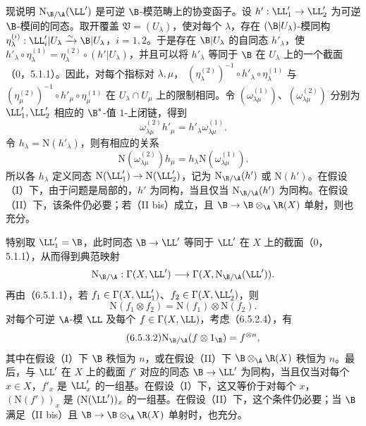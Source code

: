 现说明 $\mathrm N_{\B/\A}(\LL')$ 是可逆 $\B$-模范畴上的协变函子。设 $h':\LL'_1\to\LL'_2$ 为可逆 $\B$-模间的同态。取开覆盖 $\mathfrak V=(U_\lambda)$，使对每个 $\lambda$，存在 $(\B|U_\lambda)$-模同构
$\eta_\lambda^{(i)}:\LL'_i|U_\lambda\xrightarrow{\sim}\B|U_\lambda$，$i=1,2$。于是存在 $\B|U_\lambda$ 的自同态 $h'_\lambda$，使
$h'_\lambda\circ\eta_\lambda^{(1)}=\eta_\lambda^{(2)}\circ(h'|U_\lambda)$，并且可以将 $h'_\lambda$ 等同于 $\B$ 在 $U_\lambda$ 上的一个截面（0，5.1.1）。因此，对每个指标对 $\lambda,\mu$，
$(\eta_\lambda^{(2)})^{-1}\circ h'_\lambda\circ\eta_\lambda^{(1)}$
与
$(\eta_\mu^{(2)})^{-1}\circ h'_\mu\circ\eta_\mu^{(1)}$
在 $U_\lambda\cap U_\mu$ 上的限制相同。令 $(\omega_{\lambda\mu}^{(1)})$、$(\omega_{\lambda\mu}^{(2)})$ 分别为 $\LL'_1,\LL'_2$ 相应的 $\B^*$-值 $1$-上闭链，得到
\[
\omega_{\lambda\mu}^{(2)}h'_\mu=h'_\lambda\omega_{\lambda\mu}^{(1)}.
\]
令 $h_\lambda=\mathrm N(h'_\lambda)$，则有相应的关系
\[
\mathrm N(\omega_{\lambda\mu}^{(2)})h_\mu
=h_\lambda\mathrm N(\omega_{\lambda\mu}^{(1)}).
\]
所以各 $h_\lambda$ 定义同态 $\mathrm N(\LL'_1)\to\mathrm N(\LL'_2)$，记为 $\mathrm N_{\B/\A}(h')$ 或 $\mathrm N(h')$。在假设（I）下，由于问题是局部的，$h'$ 为同构，当且仅当 $\mathrm N_{\B/\A}(h')$ 为同构。在假设（II）下，该条件仍必要；若（II bis）成立，且 $\B\to\B\otimes_\A\R(X)$ 单射，则也充分。

特别取 $\LL'_1=\B$，此时同态 $\B\to\LL'$ 等同于 $\LL'$ 在 $X$ 上的截面（0，5.1.1），从而得到典范映射
\[
\mathrm N_{\B/\A}:\Gamma(X,\LL')\longrightarrow
\Gamma(X,\mathrm N_{\B/\A}(\LL')).
\]
再由（6.5.1.1），若 $f_1\in\Gamma(X,\LL'_1)$、$f_2\in\Gamma(X,\LL'_2)$，则
\begin{equation}\tag{6.5.3.1}
\mathrm N(f_1\otimes f_2)=\mathrm N(f_1)\otimes\mathrm N(f_2).
\end{equation}
对每个可逆 $\A$-模 $\LL$ 及每个 $f\in\Gamma(X,\LL)$，考虑（6.5.2.4），有
\begin{equation}\tag{6.5.3.2}
\mathrm N_{\B/\A}(f\otimes1_\B)=f^{\otimes n},
\end{equation}
其中在假设（I）下 $\B$ 秩恒为 $n$，或在假设（II）下 $\B\otimes_\A\R(X)$ 秩恒为 $n$。最后，与 $\LL'$ 在 $X$ 上的截面 $f'$ 对应的同态 $\B\to\LL'$ 为同构，当且仅当对每个 $x\in X$，$f'_x$ 是 $\LL'_x$ 的一组基。在假设（I）下，这又等价于对每个 $x$，$(\mathrm N(f'))_x$ 是 $(\mathrm N(\LL'))_x$ 的一组基。在假设（II）下，这个条件仍必要；当 $\B$ 满足（II bis）且 $\B\to\B\otimes_\A\R(X)$ 单射时，也充分。


